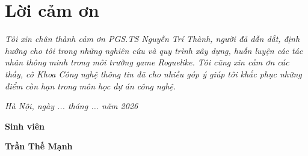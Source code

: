 \clearpage
{}

\chapter*{Lời cảm ơn}

\textit{Tôi xin chân thành cảm ơn PGS.TS Nguyễn Trí Thành, người đã dẫn dắt, định hướng cho tôi trong những nghiên cứu và quy trình xây dựng, huấn luyện các tác nhân thông minh trong môi trường game Roguelike. Tôi cũng xin cảm ơn các thầy, cô Khoa Công nghệ thông tin đã cho nhiều góp ý giúp tôi khắc phục những điểm còn hạn trong môn học dự án công nghệ.}


\vspace{1cm}
\hspace{7cm}\textit{Hà Nội, ngày ... tháng ... năm 2026}

\hspace{9.4cm}\textbf{Sinh viên}


\hspace{8.85cm}\textbf{Trần Thế Mạnh}